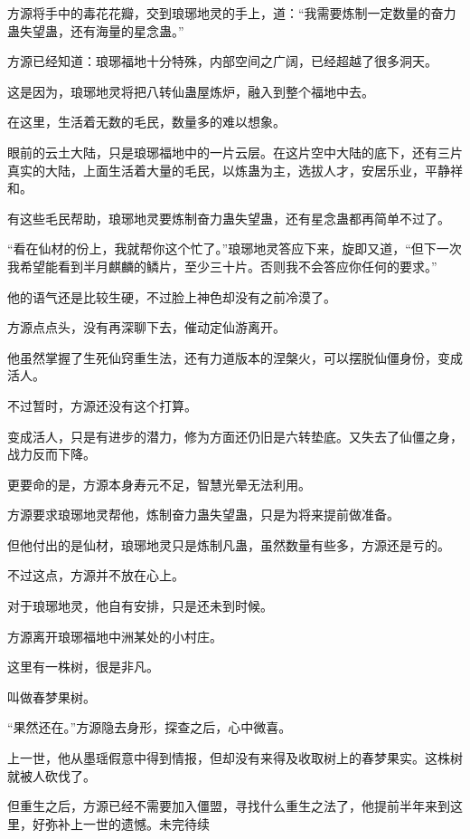 \begin{this_body}
方源将手中的毒花花瓣，交到琅琊地灵的手上，道：“我需要炼制一定数量的奋力蛊失望蛊，还有海量的星念蛊。”

方源已经知道：琅琊福地十分特殊，内部空间之广阔，已经超越了很多洞天。

这是因为，琅琊地灵将把八转仙蛊屋炼炉，融入到整个福地中去。

在这里，生活着无数的毛民，数量多的难以想象。

眼前的云土大陆，只是琅琊福地中的一片云层。在这片空中大陆的底下，还有三片真实的大陆，上面生活着大量的毛民，以炼蛊为主，选拔人才，安居乐业，平静祥和。

有这些毛民帮助，琅琊地灵要炼制奋力蛊失望蛊，还有星念蛊都再简单不过了。

“看在仙材的份上，我就帮你这个忙了。”琅琊地灵答应下来，旋即又道，“但下一次我希望能看到半月麒麟的鳞片，至少三十片。否则我不会答应你任何的要求。”

他的语气还是比较生硬，不过脸上神色却没有之前冷漠了。

方源点点头，没有再深聊下去，催动定仙游离开。

他虽然掌握了生死仙窍重生法，还有力道版本的涅槃火，可以摆脱仙僵身份，变成活人。

不过暂时，方源还没有这个打算。

变成活人，只是有进步的潜力，修为方面还仍旧是六转垫底。又失去了仙僵之身，战力反而下降。

更要命的是，方源本身寿元不足，智慧光晕无法利用。

方源要求琅琊地灵帮他，炼制奋力蛊失望蛊，只是为将来提前做准备。

但他付出的是仙材，琅琊地灵只是炼制凡蛊，虽然数量有些多，方源还是亏的。

不过这点，方源并不放在心上。

对于琅琊地灵，他自有安排，只是还未到时候。

方源离开琅琊福地中洲某处的小村庄。

这里有一株树，很是非凡。

叫做春梦果树。

“果然还在。”方源隐去身形，探查之后，心中微喜。

上一世，他从墨瑶假意中得到情报，但却没有来得及收取树上的春梦果实。这株树就被人砍伐了。

但重生之后，方源已经不需要加入僵盟，寻找什么重生之法了，他提前半年来到这里，好弥补上一世的遗憾。未完待续

\end{this_body}

